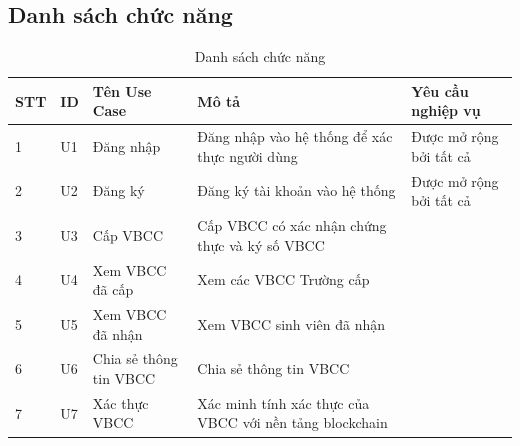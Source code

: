 \subsection{Danh sách chức năng}

\begin{table}[H]
\caption{Danh sách chức năng}
	\label{table:usecase}
	\begin{tabularx} {\textwidth} {|p{1cm}|p{1cm}|p{3cm}|X|X|}
\hline
		STT &	ID & Tên Use Case & Mô tả & Yêu cầu nghiệp vụ \\ \hline
		1 & U1	& Đăng nhập &Đăng nhập vào hệ thống để xác thực người dùng &Được mở rộng bởi tất cả \\ \hline
		2 & U2 & Đăng ký  & Đăng ký tài khoản vào hệ thống & Được mở rộng bởi tất cả\\ \hline
		3 & U3	&Cấp VBCC & Cấp VBCC có xác nhận chứng thực và ký số VBCC & \\ \hline
		4& U4	& Xem VBCC đã cấp&  Xem các VBCC Trường cấp & \\ \hline
		5 & U5	&Xem VBCC đã nhận & Xem VBCC sinh viên đã nhận& \\ \hline
	6	& U6	&Chia sẻ thông tin VBCC &Chia sẻ thông tin VBCC & \\ \hline
		7& U7	& Xác thực VBCC &Xác minh tính xác thực của VBCC với nền tảng blockchain & \\ \hline
\end{tabularx}
\end{table}

